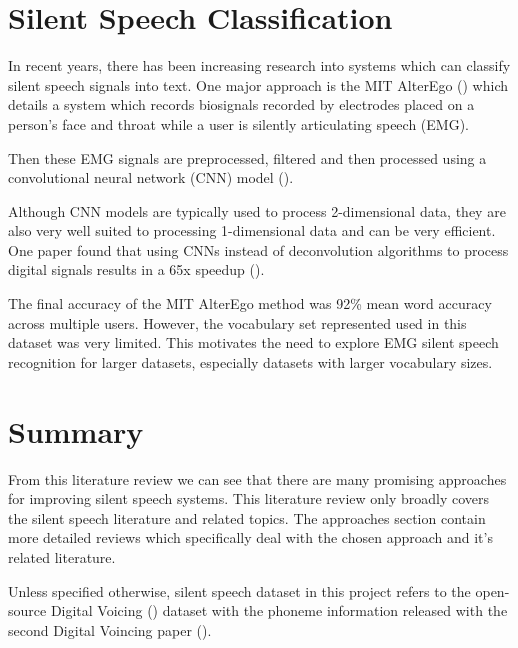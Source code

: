 \section{Silent Speech Classification}

In recent years, there has been increasing research into systems
which can classify silent speech signals into text. One major approach
is the MIT AlterEgo (\cite{alter_ego}) which details a system which 
records biosignals recorded by electrodes placed on a person's face and
throat while a user is silently articulating speech (EMG).

Then these EMG signals are preprocessed, filtered and then processed
using a convolutional neural network (CNN) model (\cite{cnn_def}).

Although CNN models are typically used
to process 2-dimensional data, they are also very well suited
to processing 1-dimensional data and can be very efficient. One
paper found that using CNNs instead of deconvolution algorithms
to process digital signals results in a 65x speedup (\cite{cnn_dsp}).

The final accuracy of the MIT AlterEgo method 
was 92\% mean word accuracy across multiple
users. However, the vocabulary set represented used in this dataset
was very limited. This motivates the need to explore
EMG silent speech recognition for larger datasets, especially datasets
with larger vocabulary sizes.

\section{Summary}

From this literature review we can see that there are many promising approaches
for improving silent speech systems. This literature review only broadly
covers the silent speech literature and related topics.
The approaches section contain more detailed reviews which
specifically deal with the chosen approach and it's related literature.

Unless specified otherwise, silent speech dataset in this project
refers to the open-source Digital Voicing (\cite{gaddy2020digital})
dataset with the phoneme information
released with the second Digital Voincing paper (\cite{gaddy2021improved}).